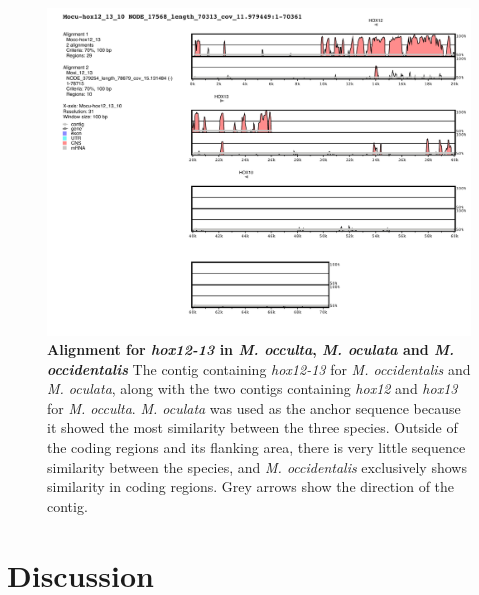 \begin{figure}[tbp]
\centering
\includegraphics[scale=0.6]{figures/Hox12_13.pdf}
\caption{\textbf{Alignment for \textit{hox12-13} in \textit{M. occulta}, \textit{M. oculata} and \textit{M. occidentalis}} The contig containing \textit{hox12-13} for \textit{M. occidentalis} and \textit{M. oculata}, along with the two contigs containing \textit{hox12} and \textit{hox13} for \textit{M. occulta}. \textit{M. oculata} was used as the anchor sequence because it showed the most similarity between the three species. Outside of the coding regions and its flanking area, there is very little sequence similarity between the species, and \textit{M. occidentalis} exclusively shows similarity in coding regions. Grey arrows show the direction of the contig.}
\label{fig:hox12}
\end{figure}

\section{Discussion}

